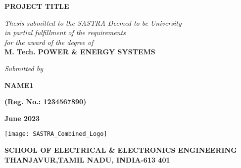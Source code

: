 \documentclass[a4paper, 12pt, oneside]{sastra1}
\begin{document}
\onehalfspacing
	
	\thispagestyle{empty}
	\begin{center}
		\Large{\textbf{PROJECT TITLE}}
	\end{center}
	\bigskip{}
	\bigskip{}
	\bigskip{}
	\begin{center}
		\textit{Thesis submitted to the SASTRA Deemed to be University\\ 
			in partial fulfillment of the requirements\\
			for the award of the degree of\\
		}
		\bigskip{}
		\bigskip{}
		\large{\textbf{M. Tech. POWER \& ENERGY SYSTEMS}}
		\bigskip{}
		\bigskip{}
		\bigskip{}
		\bigskip{}
		\bigskip{}
		\bigskip{}
	\end{center}
	\begin{center}
		\textit{Submitted by}\\
	\end{center}
	\begin{center}
		\begin{singlespacing}
				\textbf{\Large{NAME1}}
			
			\textbf{\large{(Reg. No.: 1234567890)}}
		
		\end{singlespacing}
	\end{center}
	\bigskip{}
	
	\begin{center}
		\Large{\textbf{June 2023}}   %
	\end{center}
	\bigskip{}
	\begin{center}
		\texttt{[image: SASTRA\_Combined\_Logo]}
	\end{center}
	
	\begin{center}
		\large{\textbf{SCHOOL OF ELECTRICAL \& ELECTRONICS ENGINEERING}} %
		{\textbf{THANJAVUR,TAMIL NADU, INDIA-613 401}}
	\end{center}
	
	
	\newpage
	
	\setcounter{page}{2}
	
\end{document}
